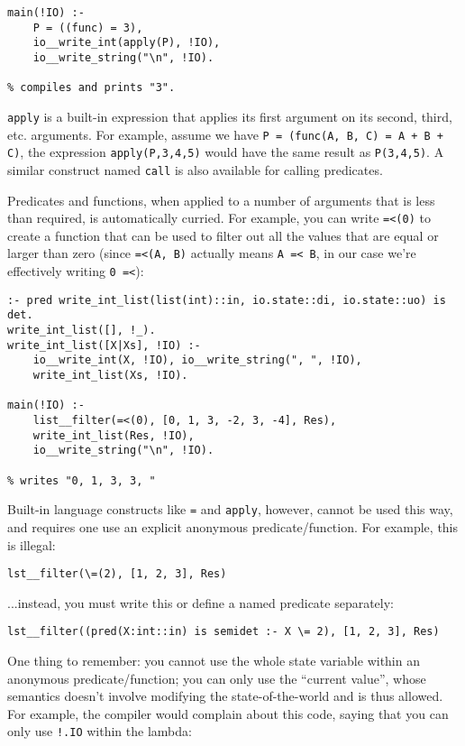 \begin{lstlisting}[language=Mercury]
main(!IO) :-
	P = ((func) = 3),
	io__write_int(apply(P), !IO),
	io__write_string("\n", !IO).

% compiles and prints "3".
\end{lstlisting}

\texttt{apply} is a built-in expression that applies its first argument on its second, third, etc. arguments. For example, assume we have \texttt{P = (func(A, B, C) = A + B + C)}, the expression \texttt{apply(P,3,4,5)} would have the same result as \texttt{P(3,4,5)}. A similar construct named \texttt{call} is also available for calling predicates.

Predicates and functions, when applied to a number of arguments that is less than required, is automatically curried. For example, you can write \texttt{=<(0)} to create a function that can be used to filter out all the values that are equal or larger than zero (since \texttt{=<(A, B)} actually means \texttt{A =< B}, in our case we're effectively writing \texttt{0 =<}):

\begin{lstlisting}[language=Mercury]
:- pred write_int_list(list(int)::in, io.state::di, io.state::uo) is det.
write_int_list([], !_).
write_int_list([X|Xs], !IO) :-
	io__write_int(X, !IO), io__write_string(", ", !IO),
	write_int_list(Xs, !IO).

main(!IO) :-
	list__filter(=<(0), [0, 1, 3, -2, 3, -4], Res),
	write_int_list(Res, !IO),
	io__write_string("\n", !IO).

% writes "0, 1, 3, 3, "
\end{lstlisting}

Built-in language constructs like \texttt{=} and \texttt{apply}, however, cannot be used this way, and requires one use an explicit anonymous predicate/function. For example, this is illegal:

\begin{lstlisting}[language=Mercury]
% ...
lst__filter(\=(2), [1, 2, 3], Res)
\end{lstlisting}

...instead, you must write this or define a named predicate separately:

\begin{lstlisting}[language=Mercury]
% ...
lst__filter((pred(X:int::in) is semidet :- X \= 2), [1, 2, 3], Res)
\end{lstlisting}

One thing to remember: you cannot use the whole state variable within an anonymous predicate/function; you can only use the ``current value'', whose semantics doesn't involve modifying the state-of-the-world and is thus allowed. For example, the compiler would complain about this code, saying that you can only use \texttt{!.IO} within the lambda:

